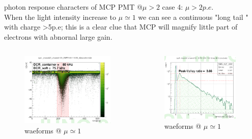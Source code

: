 \documentclass[11pt,compress,xcolor=x11names,UTF8]{beamer}
\begin{document}
\begin{frame}{photon response characters of MCP PMT @$\mu >2$ }
	case 4: $\mu >2p.e.$\\
	When the light intensity increase to $\mu\simeq 1$ we can see a continuous "long tail " with charge >5p.e; this is a clear clue that MCP will magnify little part of electrons  with abnornal large gain. 
\begin{columns}
\begin{column}{.495\textwidth}
\begin{figure}
\centering
\includegraphics[width=0.97\textwidth]{figure/onepewave.png} %
\caption{waeforms @ $\mu\simeq  1$}
\end{figure}
\end{column}
\begin{column}{.475\textwidth}
\begin{figure}
\centering
\includegraphics[width=0.94\textwidth]{figure/onepeqdc.png} %
\caption{waeforms @ $\mu\simeq  1$}
\end{figure}
\end{column}
\end{columns}
\end{frame}
\end{document}
